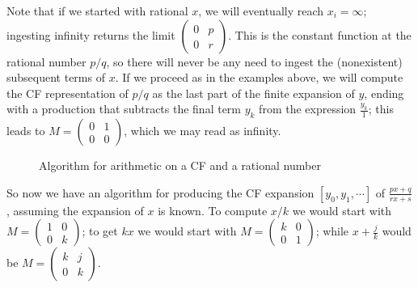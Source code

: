 \documentclass[11pt, oneside]{amsart}   	%
\newcommand{\pqrs}{\left(
\begin{smallmatrix} 
p & q\\ 
r & s 
\end{smallmatrix}
\right)}
\begin{document}
Note that if we started with rational $x$, we will eventually reach $x_i = \infty$; ingesting infinity returns the limit ${\left(
\begin{smallmatrix} 
0 & p\\ 
0 & r
\end{smallmatrix}
\right)}$.
This is the constant function at the rational number $p/q$, so there will never be any need to ingest the (nonexistent) subsequent 
terms of $x$. If we proceed as in the examples above, we will compute the CF representation of $p/q$ as the last part of the finite
expansion of $y$, ending with a production that subtracts the final term $y_k$ from the expression $\frac{y_k}{1}$; this leads to
$M=\left(\begin{smallmatrix}0 & 1 \\ 0 & 0\end{smallmatrix}\right)$, which we may read as infinity.

\begin{figure}\label{fig:oneCFarith}
\begin{algorithmic}
 
 
\STATE{$M \gets \pqrs$} 
           \ENDWHILE
\ENDWHILE
\end{algorithmic}
\caption{Algorithm for arithmetic on a CF and a rational number}
\end{figure}

So now we have an algorithm for producing the CF expansion $[y_0,y_1,\cdots]$ of $\frac{px+q}{rx+s}$,
assuming the expansion of $x$ is known.
To compute $x/k$ we would start with $M=\left(
\begin{smallmatrix} 
1 & 0\\ 
0 & k 
\end{smallmatrix}
\right)$; 
to get $kx$ we would start with $M=\left(
\begin{smallmatrix} 
k & 0\\ 
0 & 1 
\end{smallmatrix}
\right)$; while $x+\frac{j}{k}$ would be $M=\left(
\begin{smallmatrix} 
k & j\\ 
0 & k 
\end{smallmatrix}
\right)$.
\end{document}
